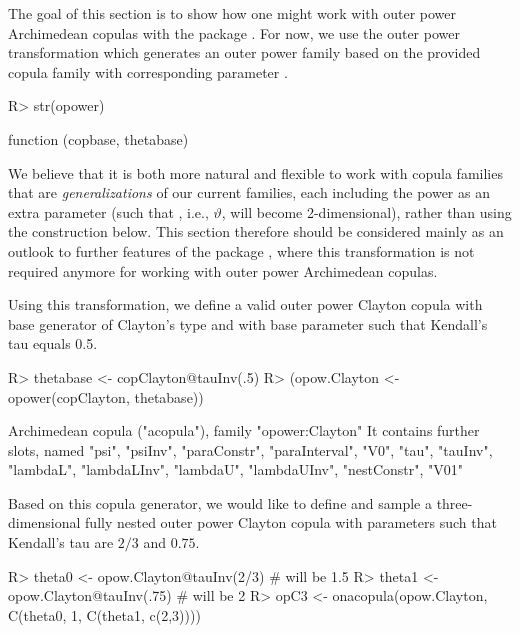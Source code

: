 \documentclass[nojss,article]{jss}
\theoremstyle{mythmstyle}
\begin{document}
The goal of this section is to show how one might work with outer power
Archimedean copulas with the package .
For now, we use the outer power transformation 
which generates an outer power family based on the provided copula family
 with corresponding parameter .
\begin{Schunk}
\begin{Sinput}
R> str(opower)
\end{Sinput}
\begin{Soutput}
function (copbase, thetabase)  
\end{Soutput}
\end{Schunk}
We believe that it is both more natural and flexible
to work with copula families that are \emph{generalizations} of our current
families, each including the power as an extra parameter (such that
, i.e., $\vartheta$, will become 2-dimensional), rather than
using the  construction below. This section therefore should be
considered mainly as an outlook to further features of the package
, where this transformation is not required anymore for working
with outer power Archimedean copulas.

Using this transformation, we define a valid outer power Clayton copula with
base generator of Clayton's type and with base parameter such that Kendall's tau
equals 0.5.
\begin{Schunk}
\begin{Sinput}
R> thetabase <- copClayton@tauInv(.5)
R> (opow.Clayton <- opower(copClayton, thetabase))
\end{Sinput}
\begin{Soutput}
Archimedean copula ("acopula"), family "opower:Clayton"
 It contains further slots, named
  "psi", "psiInv", "paraConstr", "paraInterval", "V0", "tau",
  "tauInv", "lambdaL", "lambdaLInv", "lambdaU", "lambdaUInv",
  "nestConstr", "V01"
\end{Soutput}
\end{Schunk}

Based on this copula generator, we would like to define and sample a
three-dimensional fully nested outer power Clayton copula with parameters
such that Kendall's tau are $2/3$ and $0.75$.
\begin{Schunk}
\begin{Sinput}
R> theta0 <- opow.Clayton@tauInv(2/3) # will be 1.5
R> theta1 <- opow.Clayton@tauInv(.75) # will be 2
R> opC3 <- onacopula(opow.Clayton, C(theta0, 1, C(theta1, c(2,3))))
\end{Sinput}
\end{Schunk}
\end{document}
